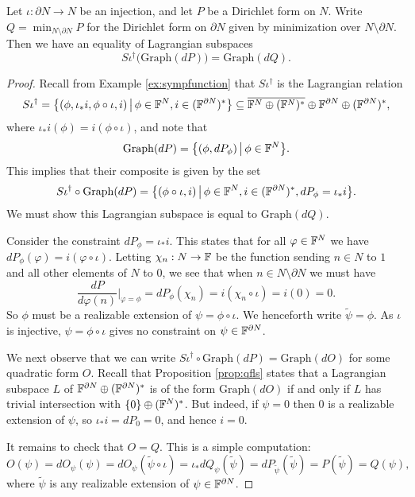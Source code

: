 \begin{theorem} \label{thm:sympmin}
  Let $\iota: \partial N \to N$ be an injection, and let $P$ be a Dirichlet form on
  $N$. Write $Q = \min_{N \setminus \partial N} P$ for the Dirichlet form on
  $\partial N$ given by minimization over $N \setminus \partial N$. Then we have an
  equality of Lagrangian subspaces
  \[
    S\iota^\dagger \big( \mathrm{Graph}(dP)\big) = \mathrm{Graph}(dQ).
  \]
\end{theorem}
\begin{proof}
  Recall from Example \ref{ex:sympfunction} that $S\iota^\dagger$ is the Lagrangian relation
  \[
    S\iota^\dagger = \big\{(\phi, \iota_\ast i,\phi \circ \iota, i) \, \big\vert
      \, \phi \in {\mathbb F}^{N}, i \in ({\mathbb F}^{\partial N})^\ast \big\} \subseteq
      \overline{{\mathbb F}^N \oplus ({\mathbb F}^N)^\ast} \oplus {\mathbb F}^{\partial N} \oplus
      ({\mathbb F}^{\partial N})^\ast,
  \]
  where $\iota_\ast i(\phi) = i(\phi \circ \iota)$, and note that 
  \[
    \mathrm{Graph}(dP) = \big\{(\phi,dP_\phi) \,\big\vert\, \phi \in {\mathbb F}^N\big\}.
  \]
  This implies that their composite is given by the set
  \[
    S\iota^\dagger \circ \mathrm{Graph}(dP) = \big\{(\phi \circ \iota, i)
    \,\big\vert\, \phi \in {\mathbb F}^N, i \in ({\mathbb F}^{\partial N})^\ast, dP_\phi =
  \iota_\ast i \big\}.
  \]
  We must show this Lagrangian subspace is equal to $\mathrm{Graph}(dQ)$.
  
  Consider the constraint $dP_\phi = \iota_\ast i$. This states that for all
  $\varphi \in {\mathbb F}^N$ we have $dP_\phi(\varphi) = i(\varphi\circ \iota)$. Letting
  $\chi_n: N \to {\mathbb F}$ be the function sending $n \in N$ to $1$ and all other
  elements of $N$ to $0$, we see that when $n \in N \setminus \partial N$ we
  must have
  \[
    \frac{dP}{d\varphi(n)}\Bigg\vert_{\varphi = \phi}  = dP_\phi(\chi_n) = 
    i(\chi_n \circ \iota) = i(0) = 0.
  \]
  So $\phi$ must be a realizable extension of $\psi = \phi \circ \iota$. We
  henceforth write $\tilde\psi = \phi$. As $\iota$ is injective, $\psi = \phi
  \circ \iota$ gives no constraint on $\psi \in {\mathbb F}^{\partial N}$. 
 
  We next observe that we can write $S\iota^\dagger \circ \mathrm{Graph}(dP) =
  \mathrm{Graph}(dO)$ for some quadratic form $O$. Recall that Proposition
  \ref{prop:qfls} states that a Lagrangian subspace $L$ of ${\mathbb F}^{\partial N}
  \oplus ({\mathbb F}^{\partial N})^\ast$ is of the form $\mathrm{Graph}(dO)$ if and only
  if $L$ has trivial intersection with $\{0\} \oplus ({\mathbb F}^N)^\ast$. But indeed,
  if $\psi = 0$ then $0$ is a realizable extension of $\psi$, so $\iota_\ast i =
  dP_0 = 0$, and hence $i = 0$. 
  
  It remains to check that $O = Q$. This is a simple computation:
  \[
    O(\psi) = dO_\psi(\psi) = dO_\psi(\tilde\psi \circ \iota) = \iota_\ast
    dQ_\psi(\tilde\psi) = dP_{\tilde\psi}(\tilde\psi) = P(\tilde\psi) = Q(\psi),
  \]
  where $\tilde\psi$ is any realizable extension of $\psi \in {\mathbb F}^{\partial N}$.
\end{proof}


